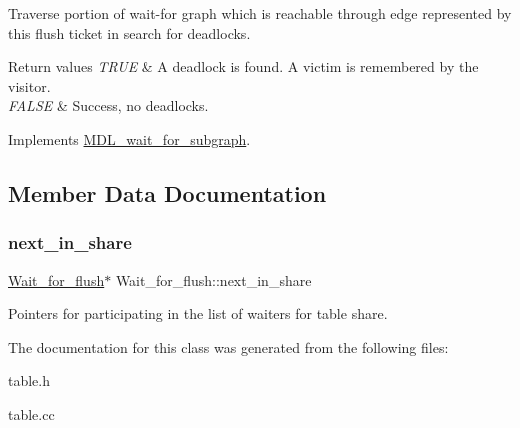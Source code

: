 Traverse portion of wait-\/for graph which is reachable through edge represented by this flush ticket in search for deadlocks.


\begin{DoxyRetVals}{Return values}
{\em T\+R\+UE} & A deadlock is found. A victim is remembered by the visitor. \\
\hline
{\em F\+A\+L\+SE} & Success, no deadlocks. \\
\hline
\end{DoxyRetVals}


Implements \mbox{\hyperlink{classMDL__wait__for__subgraph_ad14f796a25430ecabd24572efa22f3f5}{M\+D\+L\+\_\+wait\+\_\+for\+\_\+subgraph}}.



\subsection{Member Data Documentation}
\mbox{\label{classWait__for__flush_a4c6991330bc28f7cdbc2a924dfef3a38}} 
\subsubsection{\texorpdfstring{next\+\_\+in\+\_\+share}{next\_in\_share}}
{\footnotesize\ttfamily \mbox{\hyperlink{classWait__for__flush}{Wait\+\_\+for\+\_\+flush}}$\ast$ Wait\+\_\+for\+\_\+flush\+::next\+\_\+in\+\_\+share}

Pointers for participating in the list of waiters for table share. 

The documentation for this class was generated from the following files\+:\begin{DoxyCompactItemize}
\item 
table.\+h\item 
table.\+cc\end{DoxyCompactItemize}
